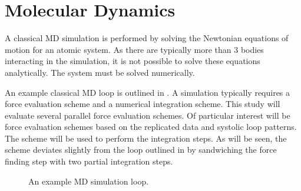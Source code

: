 %
%
\section{Molecular Dynamics}

%
A classical MD simulation is performed by
solving the Newtonian equations of motion for
an atomic system.
%
As there are typically more than 3 bodies interacting in the simulation,
it is not possible to solve these equations analytically.
%
The system must be solved numerically.

%
An example classical MD loop is outlined in .
%
A simulation typically requires a force evaluation scheme
and a numerical integration scheme.
%
This study will evaluate several parallel force evaluation schemes.
%
Of particular interest will be force evaluation schemes based on
the replicated data and systolic loop patterns.
%
The \velocityverlet{} scheme will be used to perform the integration steps.
%
As will be seen, the \velocityverlet{} scheme deviates slightly from
the loop outlined in  by sandwiching the
force finding step with two partial integration steps.

\begin{figure}[!h]
    \begin{center}
    \end{center}
    \caption{An example MD simulation loop.}
    \label{fig:md_loop_flow_chart}
\end{figure}


